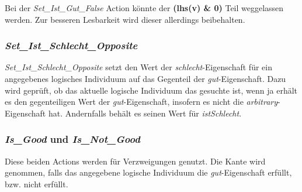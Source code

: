 Bei der \emph{Set\_Ist\_Gut\_False} Action könnte der \textbf{(lhs(v) \& 0)} Teil weggelassen werden. Zur besseren Lesbarkeit wird dieser allerdings beibehalten.




\subsubsection{\emph{Set\_Ist\_Schlecht\_Opposite}}

\emph{Set\_Ist\_Schlecht\_Opposite} setzt den Wert der \emph{schlecht}-Eigenschaft für ein angegebenes logisches Individuum auf das Gegenteil der \emph{gut}-Eigenschaft. Dazu wird geprüft, ob das aktuelle logische Individuum das gesuchte ist, wenn ja erhält es den gegenteiligen Wert der \emph{gut}-Eigenschaft, insofern es nicht die \emph{arbitrary}-Eigenschaft hat. Andernfalls behält es seinen Wert für \emph{istSchlecht}.



\subsubsection{\emph{Is\_Good} und \emph{Is\_Not\_Good}}
Diese beiden Actions werden für Verzweigungen genutzt. Die Kante wird genommen, falls das angegebene logische Individuum die \emph{gut}-Eigenschaft erfüllt, bzw. nicht erfüllt.

